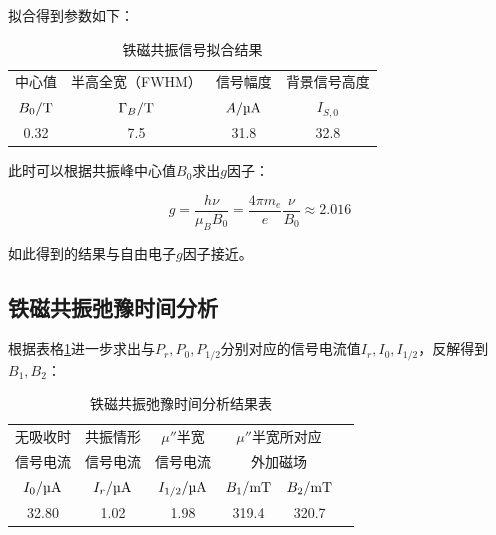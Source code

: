 \documentclass{thuemp}
\begin{document}
    拟合得到参数如下：
    
    \begin{table}[H]
        \centering
        \captionnamefont{\wuhao\bf\heiti}
        \captiontitlefont{\wuhao\bf\heiti}
        \caption{铁磁共振信号拟合结果} \label{tab:FMR_fit}
        \liuhao
        \begin{tabular}{cccc}
            \toprule
            中心值 & 半高全宽（FWHM） & 信号幅度 & 背景信号高度 \\
            $B_0/\text{\si\tesla}$ & $\Gamma_B/\text{\si\tesla}$ & $A/\text{\si{\micro\ampere}}$ & $I_{S,0}$\\
            \midrule
            0.32 & 7.5 & 31.8 & 32.8 \\
            \bottomrule
        \end{tabular}
    \end{table}
    
    此时可以根据共振峰中心值$B_0$求出$g$因子：
    
    \begin{equation}
    g = \frac{h \nu}{\mu_B B_0} = \frac{4\pi m_e}{e} \frac{\nu}{B_0}\approx 2.016
    \end{equation}
    
    如此得到的结果与自由电子$g$因子接近。
    
    \subsection{铁磁共振弛豫时间分析}
    
    根据表格\ref{tab:FMR_fit}进一步求出与$P_r, P_0, P_{1/2}$分别对应的信号电流值$I_r, I_0, I_{1/2}$，反解得到$B_{1}, B_{2}$：
    
    \begin{table}[H]
        \centering
        \captionnamefont{\wuhao\bf\heiti}
        \captiontitlefont{\wuhao\bf\heiti}
        \caption{铁磁共振弛豫时间分析结果表} \label{tab:FMR_relax}
        \liuhao
        \begin{tabular}{cccccc}
            \toprule
            无吸收时 & 共振情形 & $\mu''$半宽 &
                \multicolumn{2}{c}{$\mu''$半宽所对应}\\
            信号电流 & 信号电流 & 信号电流     &  
                \multicolumn{2}{c}{外加磁场}\\
            $I_{0}/\text{\si{\micro\ampere}}$ & 
                $I_{r}/\text{\si{\micro\ampere}}$ &
                $I_{1/2}/\text{\si{\micro\ampere}}$&
                $B_1/\text{\si{\milli\tesla}}$ &
                $B_2/\text{\si{\milli\tesla}}$ \\ 
            \midrule
            32.80& 1.02 & 1.98 & 319.4 & 320.7 \\
            \bottomrule
        \end{tabular}
    \end{table}
    
\end{document}
